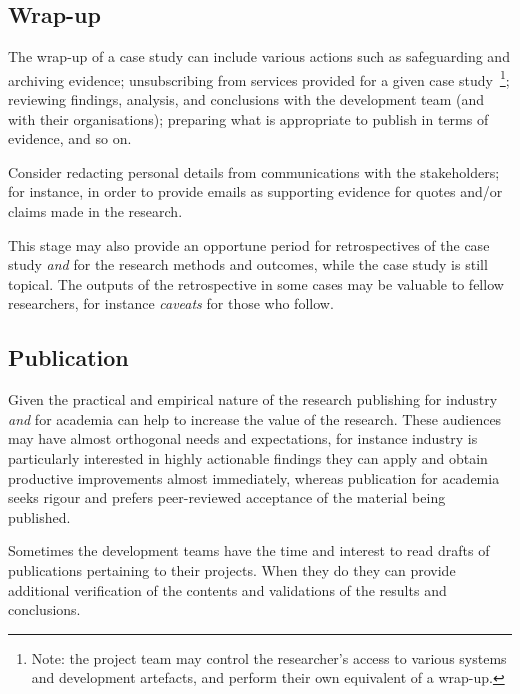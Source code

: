 \subsection{Wrap-up}

The wrap-up of a case study can include various actions such as safeguarding and archiving evidence; unsubscribing from services provided for a given case study~\footnote{Note: the project team may control the researcher's access to various systems and development artefacts, and perform their own equivalent of a wrap-up.}; reviewing findings, analysis, and conclusions with the development team (and with their organisations); preparing what is appropriate to publish in terms of evidence, and so on.

Consider redacting personal details from communications with the stakeholders; for instance, in order to provide emails as supporting evidence for quotes and/or claims made in the research.

This stage may also provide an opportune period for retrospectives of the case study \textit{and} for the research methods and outcomes, while the case study is still topical. The outputs of the retrospective in some cases may be valuable to fellow researchers, for instance \emph{caveats} for those who follow. 

\subsection{Publication}
Given the practical and empirical nature of the research publishing for industry \emph{and} for academia can help to increase the value of the research. These audiences may have almost orthogonal needs and expectations, for instance industry is particularly interested in highly actionable findings they can apply and obtain productive improvements almost immediately, whereas publication for academia seeks rigour and prefers peer-reviewed acceptance of the material being published.

Sometimes the development teams have the time and interest to read drafts of publications pertaining to their projects. When they do they can provide additional verification of the contents and validations of the results and conclusions.


